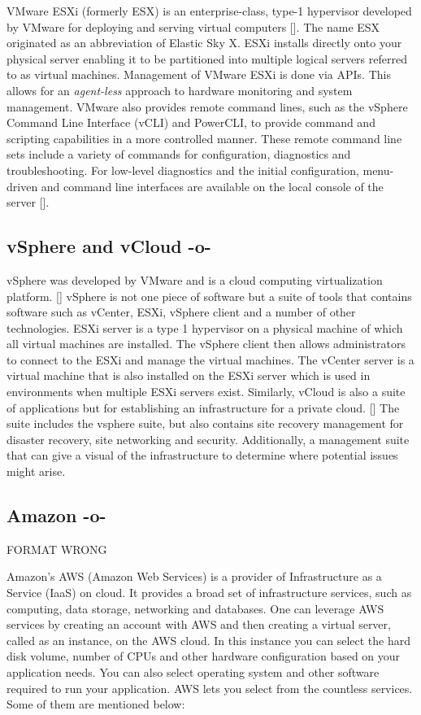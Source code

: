 VMware ESXi (formerly ESX) is an enterprise-class, type-1 hypervisor
developed by VMware for deploying and serving virtual
computers [\cite{wiki-vmwareESXi}]. The name ESX originated as an
abbreviation of Elastic Sky X. ESXi installs directly onto your
physical server enabling it to be partitioned into multiple logical
servers referred to as virtual machines.  Management of VMware ESXi is
done via APIs. This allows for an \textit{agent-less} approach to
hardware monitoring and system management. VMware also provides remote
command lines, such as the vSphere Command Line Interface (vCLI) and
PowerCLI, to provide command and scripting capabilities in a more
controlled manner. These remote command line sets include a variety of
commands for configuration, diagnostics and troubleshooting. For
low-level diagnostics and the initial configuration, menu-driven and
command line interfaces are available on the local console of the
server [\cite{vmware-esxi}].
     
     
\subsection{vSphere and vCloud -o-}

vSphere was developed by VMware and is a cloud computing
virtualization platform. [\cite{www-vmware}] vSphere is not one piece of
software but a suite of tools that contains software such as vCenter,
ESXi, vSphere client and a number of other technologies.  ESXi server
is a type 1 hypervisor on a physical machine of which all virtual
machines are installed.  The vSphere client then allows administrators
to connect to the ESXi and manage the virtual machines.  The vCenter
server is a virtual machine that is also installed on the ESXi server
which is used in environments when multiple ESXi servers exist.
Similarly, vCloud is also a suite of applications but for establishing
an infrastructure for a private cloud. [\cite{www-mustbegeek}] The suite
includes the vsphere suite, but also contains site recovery management
for disaster recovery, site networking and security.  Additionally, a
management suite that can give a visual of the infrastructure to
determine where potential issues might arise.
     
\subsection{Amazon -o-}

FORMAT WRONG

Amazon's AWS (Amazon Web Services) is a provider of Infrastructure as
a Service (IaaS) on cloud. It provides a broad set of infrastructure
services, such as computing, data storage, networking and databases.
One can leverage AWS services by creating an account with AWS and then
creating a virtual server, called as an instance, on the AWS cloud.
In this instance you can select the hard disk volume, number of CPUs
and other hardware configuration based on your application needs.  You
can also select operating system and other software required to run
your application. AWS lets you select from the countless services.
Some of them are mentioned below:

